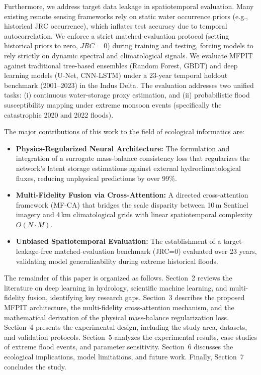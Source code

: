 \documentclass[preprint,12pt]{elsarticle}
\begin{document}
Furthermore, we address target data leakage in spatiotemporal evaluation. Many existing remote sensing frameworks rely on static water occurrence priors (e.g., historical JRC occurrence), which inflates test accuracy due to temporal autocorrelation. We enforce a strict matched-evaluation protocol (setting historical priors to zero, $JRC=0$) during training and testing, forcing models to rely strictly on dynamic spectral and climatological signals. We evaluate MFPIT against traditional tree-based ensembles (Random Forest, GBDT) and deep learning models (U-Net, CNN-LSTM) under a 23-year temporal holdout benchmark (2001--2023) in the Indus Delta. The evaluation addresses two unified tasks: (i) continuous water-storage proxy estimation, and (ii) probabilistic flood susceptibility mapping under extreme monsoon events (specifically the catastrophic 2020 and 2022 floods).

The major contributions of this work to the field of ecological informatics are:
\begin{itemize}
    \item \textbf{Physics-Regularized Neural Architecture:} The formulation and integration of a surrogate mass-balance consistency loss that regularizes the network's latent storage estimations against external hydroclimatological fluxes, reducing unphysical predictions by over 99\%.
    \item \textbf{Multi-Fidelity Fusion via Cross-Attention:} A directed cross-attention framework (MF-CA) that bridges the scale disparity between 10\,m Sentinel imagery and 4\,km climatological grids with linear spatiotemporal complexity $O(N \cdot M)$.
    \item \textbf{Unbiased Spatiotemporal Evaluation:} The establishment of a target-leakage-free matched-evaluation benchmark (JRC=0) evaluated over 23 years, validating model generalizability during extreme historical floods.
\end{itemize}

The remainder of this paper is organized as follows. Section~2 reviews the literature on deep learning in hydrology, scientific machine learning, and multi-fidelity fusion, identifying key research gaps. Section~3 describes the proposed MFPIT architecture, the multi-fidelity cross-attention mechanism, and the mathematical derivation of the physical mass-balance regularization loss. Section~4 presents the experimental design, including the study area, datasets, and validation protocols. Section~5 analyzes the experimental results, case studies of extreme flood events, and parameter sensitivity. Section~6 discusses the ecological implications, model limitations, and future work. Finally, Section~7 concludes the study.
\end{document}
